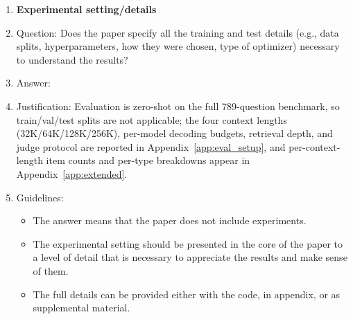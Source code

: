 \documentclass{article}
\begin{document}
\begin{enumerate}
\item {\bf Experimental setting/details}
    \item[] Question: Does the paper specify all the training and test details (e.g., data splits, hyperparameters, how they were chosen, type of optimizer) necessary to understand the results?
    \item[] Answer: \answerYes{}
    \item[] Justification: Evaluation is zero-shot on the full 789-question benchmark, so train/val/test splits are not applicable; the four context lengths (32K/64K/128K/256K), per-model decoding budgets, retrieval depth, and judge protocol are reported in Appendix~\ref{app:eval_setup}, and per-context-length item counts and per-type breakdowns appear in Appendix~\ref{app:extended}.
    \item[] Guidelines:
    \begin{itemize}
        \item The answer \answerNA{} means that the paper does not include experiments.
        \item The experimental setting should be presented in the core of the paper to a level of detail that is necessary to appreciate the results and make sense of them.
        \item The full details can be provided either with the code, in appendix, or as supplemental material.
    \end{itemize}


\end{enumerate}
\end{document}
